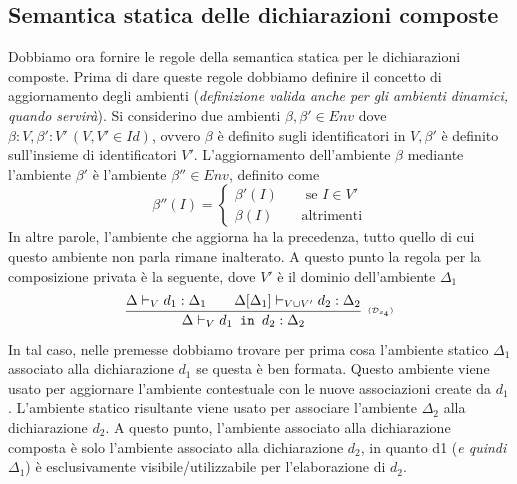 \documentclass[oneside,a4paper,11pt]{book}
\theoremstyle{italicstyle}
\theoremstyle{normStyle}
\begin{document}
\subsection{Semantica statica delle dichiarazioni composte}
Dobbiamo ora fornire le regole della semantica statica per le
dichiarazioni composte. Prima di dare queste regole dobbiamo definire
il concetto di aggiornamento degli ambienti (\textit{definizione valida anche per
gli ambienti dinamici, quando servirà}).
Si considerino due ambienti $\beta,\beta'\in Env$ dove $\beta:V, \beta':V'\,(V,V' \in Id)$,
ovvero $\beta$ è definito sugli identificatori in $V, \beta'$ è definito 
sull'insieme di identificatori $V'$. L'aggiornamento dell'ambiente 
$\beta$ mediante l'ambiente $\beta'$ è l'ambiente $\beta''\in Env$, definito 
come
\[
  \beta''(I)=
  \begin{cases}
    \beta'(I)\qquad \text{se }I\in V' \\
    \beta(I)\qquad \text{altrimenti}
  \end{cases}
\]
In altre parole, l’ambiente che aggiorna ha la precedenza, tutto
quello di cui questo ambiente non parla rimane inalterato.
A questo punto la regola per la composizione privata è la seguente,
dove $V'$ è il dominio dell’ambiente $\Delta_1$
\[
  \infer[\scriptscriptstyle (\mathcal{D}_{s_4})]
    {
      \Delta \vdash_V d_1 \texttt{ in }d_2:\Delta_2
    }
    {
      \Delta \vdash_V d_1 : \Delta_1 \qquad \Delta[\Delta_1]\vdash_{V \cup V'}d_2:\Delta_2
    }
\]
In tal caso, nelle premesse dobbiamo trovare per prima cosa l’ambiente
statico $\Delta_1$ associato alla dichiarazione $d_1$ se
questa è ben formata. Questo ambiente viene usato per aggiornare
l’ambiente contestuale con le nuove associazioni create da $d_1$.
L’ambiente statico risultante viene usato per associare l’ambiente
$\Delta_2$ alla dichiarazione
$d_2$. A questo punto, l’ambiente associato alla dichiarazione
composta è solo l’ambiente associato alla dichiarazione $d_2$, in
quanto d1 (\textit{e quindi $\Delta_1$}) è esclusivamente visibile/utilizzabile
per l’elaborazione di $d_2$.
\end{document}
